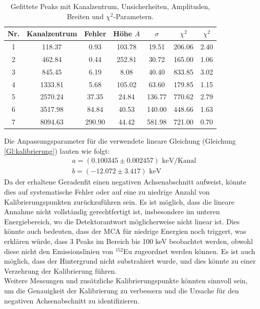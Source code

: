 \begin{table}[htbp]
    \centering
    \begin{tabular}{c|c|c|c|c|c|c}
        Nr. & Kanalzentrum & Fehler & Höhe $A$ & $\sigma$ & $\chi^2$ & $\chi^2$ \\
        \hline
        1 & 118.37  & 0.93   & 103.78 & 19.51  & 206.06 & 2.40 \\
        2 & 462.84  & 0.44   & 252.81 & 30.72  & 165.00 & 1.06 \\
        3 & 845.45  & 6.19   & 8.08   & 40.40  & 833.85 & 3.02 \\
        4 & 1333.81 & 5.68   & 105.02 & 63.60  & 179.85 & 1.15 \\
        5 & 2570.24 & 37.35  & 24.84  & 136.77 & 770.62 & 2.79 \\
        6 & 3517.98 & 84.84  & 40.53  & 140.00 & 448.66 & 1.63 \\
        7 & 8094.63 & 290.90 & 44.42  & 581.98 & 721.00 & 0.70 \\
    \end{tabular}
    \caption{Gefittete Peaks mit Kanalzentrum, Unsicherheiten, Amplituden, Breiten und $\chi^2$-Parametern.}
    \label{tab:peakfits}
\end{table}
\newpage
Die Anpassungsparameter für die verwendete lineare Gleichung (Gleichung \ref{Gl:kalibrierung}) lauten wie folgt:
\begin{align*}
    &a = (0.100345 \pm 0.002457) \text{ keV/Kanal} \\
    &b = (-12.072 \pm 3.417) \text{ keV}
\end{align*}
Da der erhaltene Geradenfit einen negativen Achsenabschnitt aufweist, könnte dies auf systematische Fehler oder auf eine zu niedrige Anzahl von Kalibrierungspunkten zurückzuführen sein. 
Es ist möglich, dass die lineare Annahme nicht vollständig gerechtfertigt ist, insbesondere im unteren Energiebereich, wo die Detektorantwort möglicherweise nicht linear ist.
Dies könnte auch bedeuten, dass der MCA für niedrige Energien noch triggert, was erklären würde, dass 3 Peaks im Bereich bis 100 keV beobachtet werden, obwohl diese nicht den Emissionslinien von $^{152}$Eu zugeordnet werden können. 
Es ist auch möglich, dass der Hintergrund nicht substrahiert wurde, und dies könnte zu einer Verzehrung der Kalibrierung führen.\\ 
Weitere Messungen und zusätzliche Kalibrierungspunkte könnten sinnvoll sein, um die Genauigkeit der Kalibrierung zu verbessern und die Ursache für den negativen Achsenabschnitt zu identifizieren.\\

